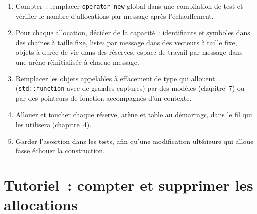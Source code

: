 \begin{method}\label{met:ll:cpp-for-latency-i-memory:remove}
\begin{enumerate}
\item Compter~: remplacer \texttt{operator new} global dans une compilation de test et vérifier le nombre d'allocations par message après l'échauffement.
\item Pour chaque allocation, décider de la capacité~: identifiants et symboles dans des chaînes à taille fixe, listes par message dans des
vecteurs à taille fixe, objets à durée de vie dans des réserves, espace de travail par message dans une arène réinitialisée à chaque message.
\item Remplacer les objets appelables à effacement de type qui allouent (\texttt{std::function} avec de grandes captures) par des modèles (chapitre~7) ou
par des pointeurs de fonction accompagnés d'un contexte.
\item Allouer et toucher chaque réserve, arène et table au démarrage, dans le fil qui les utilisera (chapitre~4).
\item Garder l'assertion dans les tests, afin qu'une modification ultérieure qui alloue fasse échouer la construction.
\end{enumerate}
\end{method}

\section{Tutoriel~: compter et supprimer les allocations}\label{tut:ll:cpp-for-latency-i-memory:tut}

